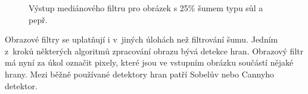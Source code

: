 \begin{figure}[htb]
    \centering
    \caption{Výstup mediánového filtru pro obrázek s 25\% šumem typu sůl a pepř.}
    \label{obrDetektor}
\end{figure}

Obrazové filtry se uplatňují i v~jiných úlohách než filtrování šumu. Jedním z~kroků některých algoritmů zpracování obrazu bývá detekce hran. Obrazový filtr má nyní za úkol označit pixely, které jsou ve vstupním obrázku součástí nějaké hrany. Mezi běžně používané detektory hran patří Sobelův nebo Cannyho detektor.


